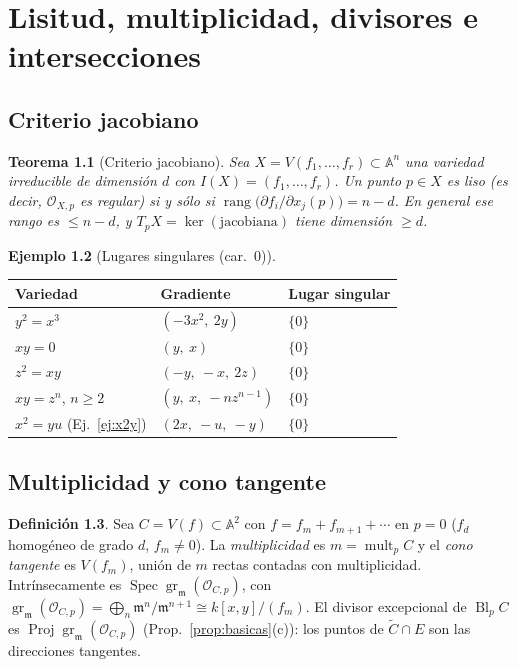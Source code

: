 \documentclass[11pt,a4paper,oneside]{book}
\newcommand{\Spec}{\operatorname{Spec}}
\newcommand{\Proj}{\operatorname{Proj}}
\newcommand{\Bl}{\operatorname{Bl}}
\newcommand{\gr}{\operatorname{gr}}
\newcommand{\mult}{\operatorname{mult}}
\newcommand{\A}{\mathbb{A}}
\newcommand{\cO}{\mathcal{O}}
\theoremstyle{plain}
\newtheorem{teorema}{Teorema}[chapter]
\theoremstyle{definition}
\newtheorem{definicion}[teorema]{Definición}
\newtheorem{ejemplo}[teorema]{Ejemplo}
\theoremstyle{remark}
\begin{document}
\chapter{Lisitud, multiplicidad, divisores e intersecciones}\label{ap:geometria}

\section{Criterio jacobiano}

\begin{teorema}[Criterio jacobiano]
Sea $X=V(f_1,\dots,f_r)\subset\A^n$ una variedad irreducible de dimensión $d$ con $I(X)=(f_1,\dots,f_r)$. Un punto $p\in X$ es liso (es decir, $\cO_{X,p}$ es regular) si y sólo si $\operatorname{rang}\big(\partial f_i/\partial x_j(p)\big)=n-d$. En general ese rango es $\le n-d$, y $T_pX=\ker(\text{jacobiana})$ tiene dimensión $\ge d$.
\end{teorema}

\begin{ejemplo}[Lugares singulares (car.\ $0$)]
\begin{center}
\begin{tabular}{@{}lll@{}}
\toprule
Variedad & Gradiente & Lugar singular \\
\midrule
$y^2=x^3$ & $(-3x^2,\ 2y)$ & $\{0\}$ \\
$xy=0$ & $(y,\ x)$ & $\{0\}$ \\
$z^2=xy$ & $(-y,\ -x,\ 2z)$ & $\{0\}$ \\
$xy=z^n$, $n\ge2$ & $(y,\ x,\ -nz^{n-1})$ & $\{0\}$ \\
$x^2=yu$ (Ej.~\ref{ej:x2y}) & $(2x,\ -u,\ -y)$ & $\{0\}$ \\
\bottomrule
\end{tabular}
\end{center}
\end{ejemplo}

\section{Multiplicidad y cono tangente}

\begin{definicion}
Sea $C=V(f)\subset\A^2$ con $f=f_m+f_{m+1}+\cdots$ en $p=0$ ($f_d$ homogéneo de grado $d$, $f_m\ne0$). La \emph{multiplicidad} es $m=\mult_pC$ y el \emph{cono tangente} es $V(f_m)$, unión de $m$ rectas contadas con multiplicidad. Intrínsecamente es $\Spec\gr_{\mathfrak m}(\cO_{C,p})$, con $\gr_{\mathfrak m}(\cO_{C,p})=\bigoplus_n\mathfrak m^n/\mathfrak m^{n+1}\cong k[x,y]/(f_m)$. El divisor excepcional de $\Bl_pC$ es $\Proj\gr_{\mathfrak m}(\cO_{C,p})$ (Prop.~\ref{prop:basicas}(c)): los puntos de $\tilde C\cap E$ son las direcciones tangentes.
\end{definicion}
\end{document}

